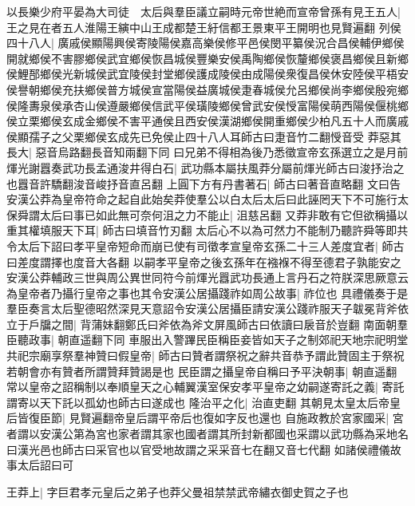 以長樂少府平晏為大司徒　太后與羣臣議立嗣時元帝世絶而宣帝曾孫有見王五人|{
	王之見在者五人淮陽王縯中山王成都楚王紆信都王景東平王開明也見賢遍翻}
列侯四十八人|{
	廣戚侯顯陽興侯寄陵陽侯嘉高樂侯修平邑侯閔平纂侯況合昌侯輔伊鄉侯開就鄉侯不害膠鄉侯武宜鄉侯恢昌城侯豐樂安侯禹陶鄉侯恢釐鄉侯褒昌鄉侯且新鄉侯鯉郚鄉侯光新城侯武宜陵侯封堂鄉侯護成陵侯由成陽侯衆復昌侯休安陸侯平梧安侯譽朝鄉侯充扶鄉侯普方城侯宣當陽侯益廣城侯疌春城侯允呂鄉侯尚李鄉侯殷宛鄉侯隆夀泉侯承杏山侯遵嚴鄉侯信武平侯璜陵鄉侯曾武安侯㥅富陽侯萌西陽侯偃桃鄉侯立栗鄉侯玄成金鄉侯不害平通侯且西安侯漢湖鄉侯開重鄉侯少柏凡五十人而廣戚侯顯孺子之父栗鄉侯玄成先已免侯止四十八人耳師古曰疌音竹二翻㥅音受}
莽惡其長大|{
	惡音烏路翻長音知兩翻下同}
曰兄弟不得相為後乃悉徵宣帝玄孫選立之是月前煇光謝囂奏武功長孟通浚井得白石|{
	武功縣本屬扶風莽分屬前煇光師古曰浚抒治之也囂音許驕翻浚音峻抒音直呂翻}
上圓下方有丹書著石|{
	師古曰著音直略翻}
文曰告安漢公莽為皇帝符命之起自此始矣莽使羣公以白太后太后曰此誣罔天下不可施行太保舜謂太后曰事已如此無可奈何沮之力不能止|{
	沮慈呂翻}
又莽非敢有它但欲稱攝以重其權填服天下耳|{
	師古曰填音竹刃翻}
太后心不以為可然力不能制乃聽許舜等即共令太后下詔曰孝平皇帝短命而崩已使有司徵孝宣皇帝玄孫二十三人差度宜者|{
	師古曰差度謂擇也度音大各翻}
以嗣孝平皇帝之後玄孫年在襁褓不得至德君子孰能安之安漢公莽輔政三世與周公異世同符今前煇光囂武功長通上言丹石之符朕深思厥意云為皇帝者乃攝行皇帝之事也其令安漢公居攝踐祚如周公故事|{
	祚位也}
具禮儀奏于是羣臣奏言太后聖德昭然深見天意詔令安漢公居攝臣請安漢公踐祚服天子韍冕背斧依立于戶牖之間|{
	背蒲妹翻鄭氏曰斧依為斧文屏風師古曰依讀曰扆音於豈翻}
南面朝羣臣聽政事|{
	朝直遥翻下同}
車服出入警蹕民臣稱臣妾皆如天子之制郊祀天地宗祀明堂共祀宗廟享祭羣神贊曰假皇帝|{
	師古曰贊者謂祭祝之辭共音恭予謂此贊固主于祭祝若朝會亦有贊者所謂贊拜贊謁是也}
民臣謂之攝皇帝自稱曰予平決朝事|{
	朝直遥翻}
常以皇帝之詔稱制以奉順皇天之心輔翼漢室保安孝平皇帝之幼嗣遂寄託之義|{
	寄託謂寄以天下託以孤幼也師古曰遂成也}
隆治平之化|{
	治直吏翻}
其朝見太皇太后帝皇后皆復臣節|{
	見賢遍翻帝皇后謂平帝后也復如字反也還也}
自施政教於宮家國采|{
	宮者謂以安漢公第為宮也家者謂其家也國者謂其所封新都國也采謂以武功縣為采地名曰漢光邑也師古曰采官也以官受地故謂之采采音七在翻又音七代翻}
如諸侯禮儀故事太后詔曰可

王莽上|{
	字巨君孝元皇后之弟子也莽父曼祖禁禁武帝繡衣御史賀之子也}


